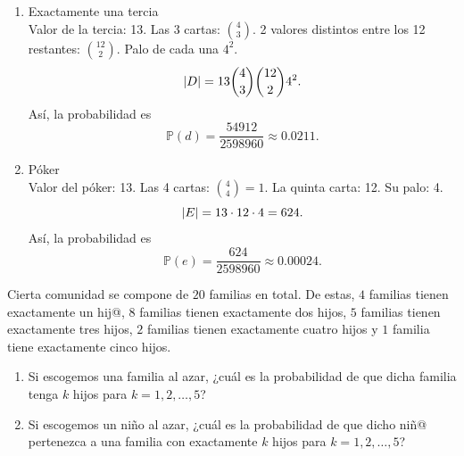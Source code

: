 \documentclass[12pt,a4paper]{article}
\begin{document}
\begin{solucion}
\begin{enumerate}
            Así, la probabilidad es
            \begin{equation*}
                \mathbb{P}(c)=\frac{123552}{2598960}\approx0.0475.
            \end{equation*}
            \item[(d)] Exactamente una tercia\\
            Valor de la tercia: 13. Las 3 cartas: $\binom{4}{3}$. 2 valores distintos entre los 12 restantes:
            $\binom{12}{2}$. Palo de cada una $4^{2}$.
            \begin{equation*}
                \abs{D}=13\binom{4}{3}\binom{12}{2}4^{2}.
            \end{equation*}
            Así, la probabilidad es
            \begin{equation*}
                \mathbb{P}(d)=\frac{54912}{2598960}\approx0.0211.
            \end{equation*}
            \item[(e)] Póker\\
            Valor del póker: 13. Las 4 cartas: $\binom{4}{4}=1$. La quinta carta: 12. Su palo: 4.
            \begin{equation*}
                \abs{E}=13\cdot12\cdot4=624.
            \end{equation*}
            Así, la probabilidad es
            \begin{equation*}
                \mathbb{P}(e)=\frac{624}{2598960}\approx0.00024.
            \end{equation*}
        \end{enumerate}
    \end{solucion}

    \begin{mdframed}[style=mdbluebox,frametitle={Ejercicio 5}]
        Cierta comunidad se compone de $20$ familias en total. De estas, 
        $4$ familias tienen exactamente un hij@, 
        $8$ familias tienen exactamente dos hijos, 
        $5$ familias tienen exactamente tres hijos, 
        $2$ familias tienen exactamente cuatro hijos y 
        $1$ familia tiene exactamente cinco hijos.

        \begin{enumerate}
            \item[(a)] Si escogemos una familia al azar, ¿cuál es la probabilidad de que dicha familia tenga $k$ hijos para $k=1,2,\dots,5$?
            \item[(b)] Si escogemos un niño al azar, ¿cuál es la probabilidad de que dicho niñ@ pertenezca a una familia con exactamente $k$ hijos para $k=1,2,\dots,5$?
        \end{enumerate}
    \end{mdframed}
\end{document}
